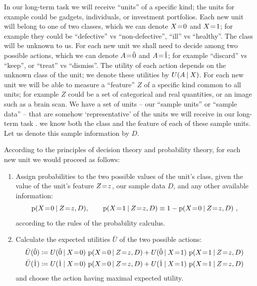 \documentclass[\ifafour a4paper,12pt,\else a5paper,10pt,\fi%
onecolumn,oneside,article,%
british%
]{memoir}
\theoremstyle{remark}
\theoremstyle{innote}
\newcommand*{\defd}{\coloneqq}
\newcommand*{\p}{\mathrm{p}}%
\renewcommand*{\|}[1][]{\nonscript\:#1\vert\nonscript\:\mathopen{}}
\newcommand*{\mo}[1][=]{\mathrel{\mkern-3.5mu#1\mkern-3.5mu}}
\newcommand*{\za}{\hat{0}}
\newcommand*{\zb}{\hat{1}}
\newcommand*{\eu}{\bar{U}}
\begin{document}
In our long-term task we will receive \enquote{units} of a specific kind; the units for example could be gadgets, individuals, or investment portfolios. Each new unit will belong to one of two classes, which we can denote $X\mo 0$ and $X\mo 1$; for example they could be \enquote{defective} vs \enquote{non-defective}, \enquote{ill} vs \enquote{healthy}. The class will be unknown to us. For each new unit we shall need to decide among two possible actions, which we can denote $A\mo\za$ and $A\mo\zb$; for example \enquote{discard} vs \enquote{keep}, or \enquote{treat} vs \enquote{dismiss}. The utility of each action depends on the unknown class of the unit; we denote these utilities by $U(A \| X)$. For each new unit we will be able to measure a \enquote{feature} $Z$ of a specific kind common to all units; for example $Z$ could be a set of categorical and real quantities, or an image such as a brain scan. We have a set of units -- our \enquote{sample units} or \enquote{sample data} -- that are somehow \enquote*{representative} of the units we will receive in our long-term task \autocites[for a critical analysis of the sometimes hollow term \enquote{representative sample} see][]{kruskaletal1979,kruskaletal1979b,kruskaletal1979c,kruskaletal1980}. we know both the class and the feature of each of these sample units. Let us denote this sample information by $D$.

According to the principles of decision theory and probability theory, for each new unit we would proceed as follows:
\begin{enumerate}[label=\arabic*.]
\item Assign probabilities to the two possible values of the unit's class, given the value of the unit's feature $Z\mo z$, our sample data $D$, and any other available information:
  \begin{equation}
    \p(X\mo 0 \| Z\mo z, D), \qquad \p(X\mo 1 \| Z\mo z,D) \equiv 1- \p(X\mo 0 \| Z\mo z,D) \ ,
  \end{equation}
  according to the rules of the probability calculus.
\item Calculate the expected utilities $\eu$ of the two possible actions:
  \begin{equation}
    \begin{aligned}
      \eu(\za) &\defd U(\za \| X\mo 0) \ 
                 \p(X\mo 0 \| Z\mo z, D) + U(\za \| X\mo 1) \ 
                 \p(X\mo 1 \| Z\mo z, D)
      \\
      \eu(\zb) &\defd U(\zb \| X\mo 0) \ 
                 \p(X\mo 0 \| Z\mo z, D) + U(\zb \| X\mo 1) \ 
                 \p(X\mo 1 \| Z\mo z, D)
    \end{aligned}
\end{equation}
  and choose the action having maximal expected utility.
\end{enumerate}
\end{document}
